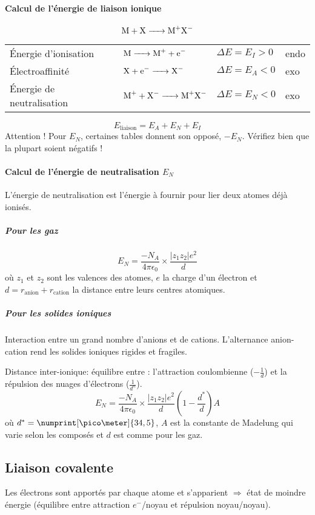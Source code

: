 \paragraph{Calcul de l'énergie de liaison ionique}
\[ \ce{M + X -> M+X-} \]
\begin{center}
	\begin{tabular}{llll}
		\'Energie d'ionisation & $\ce{M -> M+ + e-}$ & $\Delta E = E_I > 0$ & endo\\
		\'Electroaffinité & $\ce{X + e- -> X-}$ & $\Delta E = E_A < 0$ & exo\\
		\'Energie de neutralisation & $\ce{M+ + X- -> M+X-}$ & $\Delta E = E_N < 0$ & exo
	\end{tabular}
\end{center}
\[ E_{\mathrm{liaison}} = E_A + E_N + E_I \]
Attention !
Pour $E_N$, certaines tables donnent son opposé, $-E_N$.
Vérifiez bien que la plupart soient négatifs !

\paragraph{Calcul de l'énergie de neutralisation $E_N$}
\label{sec:neutral}
L'énergie de neutralisation est l'énergie à fournir pour lier deux atomes déjà ionisés.

\subparagraph{Pour les gaz}
\[ E_N = \frac{-N_A}{4\pi\epsilon_0}\times\frac{|z_1z_2|e^2}{d} \]
où $z_1$ et $z_2$ sont les valences des atomes, $e$ la charge d'un électron et $d = r_{\mathrm{anion}} + r_{\mathrm{cation}}$ la distance entre leurs centres atomiques.
\subparagraph{Pour les solides ioniques}
Interaction entre un grand nombre d'anions et de cations.
L'alternance anion-cation rend les solides ioniques rigides et fragiles.

Distance inter-ionique: équilibre entre : l'attraction coulombienne ($-\frac{1}{d}$) et la répulsion des nuages d'électrons ($\frac{1}{d^n}$).
\[ E_N = \frac{-N_A}{4\pi\epsilon_0}\times\frac{|z_1z_2|e^2}{d} \left(1-\frac{d^*}{d}\right)A \]
où $d^* = \numprint[\pico\meter]{34,5}$, $A$ est la constante de Madelung qui varie selon les composés et $d$ est comme pour les gaz.

\subsection{Liaison covalente}

Les électrons sont apportés par chaque atome et s'apparient $\Rightarrow$ état de moindre énergie (équilibre entre attraction $e^-$/noyau et répulsion noyau/noyau).

